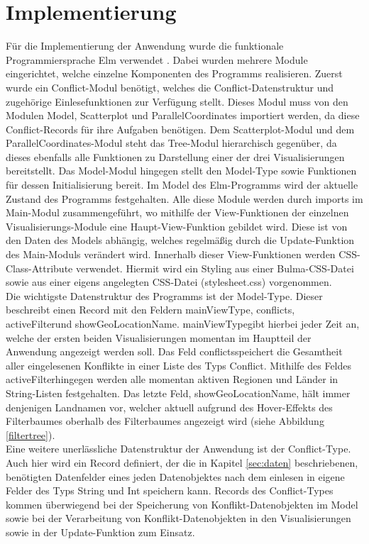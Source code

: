 \documentclass[usegeometry=true]{scrartcl}
\begin{document}
\section{Implementierung}
Für die Implementierung der Anwendung wurde die funktionale Programmiersprache Elm verwendet \cite{elm}. Dabei wurden mehrere Module eingerichtet, welche einzelne Komponenten des Programms realisieren. Zuerst wurde ein Conflict-Modul benötigt, welches die Conflict-Datenstruktur und zugehörige Einlesefunktionen zur Verfügung stellt. Dieses Modul muss von den Modulen Model, Scatterplot und ParallelCoordinates importiert werden, da diese Conflict-Records für ihre Aufgaben benötigen. Dem Scatterplot-Modul und dem ParallelCoordinates-Modul steht das Tree-Modul hierarchisch gegenüber, da dieses ebenfalls alle Funktionen zu Darstellung einer der drei Visualisierungen bereitstellt. Das Model-Modul hingegen stellt den Model-Type sowie Funktionen für dessen Initialisierung bereit. Im Model des Elm-Programms wird der aktuelle Zustand des Programms festgehalten. Alle diese Module werden durch imports im Main-Modul zusammengeführt, wo mithilfe der View-Funktionen der einzelnen Visualisierungs-Module eine Haupt-View-Funktion gebildet wird. Diese ist von den Daten des Models abhängig, welches regelmäßig durch die Update-Funktion des Main-Moduls verändert wird. Innerhalb dieser View-Funktionen werden CSS-Class-Attribute verwendet. Hiermit wird ein Styling aus einer Bulma-CSS-Datei sowie aus einer eigens angelegten CSS-Datei (\glqq stylesheet.css\grqq) vorgenommen.\\

Die wichtigste Datenstruktur des Programms ist der Model-Type. Dieser beschreibt einen Record mit den Feldern \glqq mainViewType\grqq, \glqq conflicts\grqq, \glqq activeFilter\grqq und \glqq showGeoLocationName\grqq. \glqq mainViewType\grqq gibt hierbei jeder Zeit an, welche der ersten beiden Visualisierungen momentan im Hauptteil der Anwendung angezeigt werden soll. Das Feld \glqq conflicts\grqq speichert die Gesamtheit aller eingelesenen Konflikte in einer Liste des Typs \glqq Conflict\grqq. Mithilfe des Feldes \glqq activeFilter\grqq hingegen werden alle momentan aktiven Regionen und Länder in String-Listen festgehalten. Das letzte Feld, \glqq showGeoLocationName\grqq, hält immer denjenigen Landnamen vor, welcher aktuell aufgrund des Hover-Effekts des Filterbaumes oberhalb des Filterbaumes angezeigt wird (siehe Abbildung \ref{filtertree}).\\ Eine weitere unerlässliche Datenstruktur der Anwendung ist der Conflict-Type. Auch hier wird ein Record definiert, der die in Kapitel \ref{sec:daten} beschriebenen, benötigten Datenfelder eines jeden Datenobjektes nach dem einlesen in eigene Felder des Typs String und Int speichern kann. Records des Conflict-Types kommen überwiegend bei der Speicherung von Konflikt-Datenobjekten im Model sowie bei der Verarbeitung von Konflikt-Datenobjekten in den Visualisierungen sowie in der Update-Funktion zum Einsatz.\\
\end{document}
